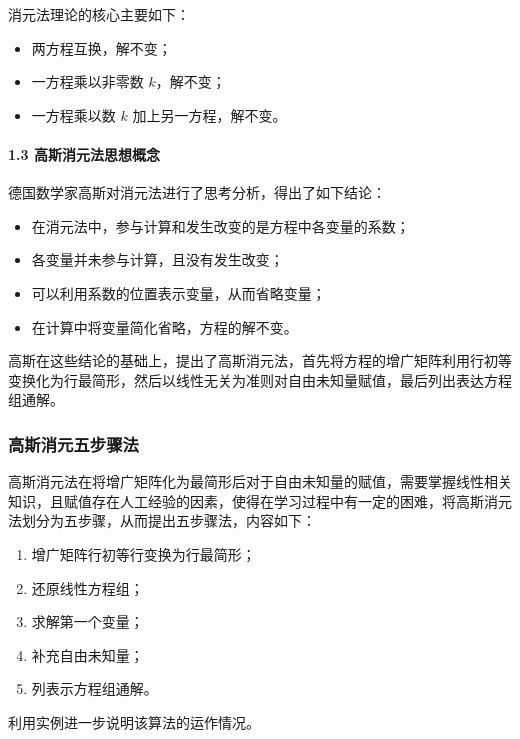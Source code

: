消元法理论的核心主要如下：

\begin{itemize}
\item 两方程互换，解不变；
\item 一方程乘以非零数 $k$，解不变；
\item 一方程乘以数 $k$ 加上另一方程，解不变。
\end{itemize}

\paragraph{1.3  高斯消元法思想概念}

德国数学家高斯对消元法进行了思考分析，得出了如下结论：

\begin{itemize}
\item 在消元法中，参与计算和发生改变的是方程中各变量的系数；
\item 各变量并未参与计算，且没有发生改变；
\item 可以利用系数的位置表示变量，从而省略变量；
\item 在计算中将变量简化省略，方程的解不变。
\end{itemize}

\begin{QUOTE}{}{}
高斯在这些结论的基础上，提出了高斯消元法，首先将方程的增广矩阵利用行初等变换化为行最简形，然后以线性无关为准则对自由未知量赋值，最后列出表达方程组通解。
\end{QUOTE}

\subsubsection{高斯消元五步骤法}

高斯消元法在将增广矩阵化为最简形后对于自由未知量的赋值，需要掌握线性相关知识，且赋值存在人工经验的因素，使得在学习过程中有一定的困难，将高斯消元法划分为五步骤，从而提出五步骤法，内容如下：

\begin{enumerate}
\item 增广矩阵行初等行变换为行最简形；
\item 还原线性方程组；
\item 求解第一个变量；
\item 补充自由未知量；
\item 列表示方程组通解。
\end{enumerate}

利用实例进一步说明该算法的运作情况。

